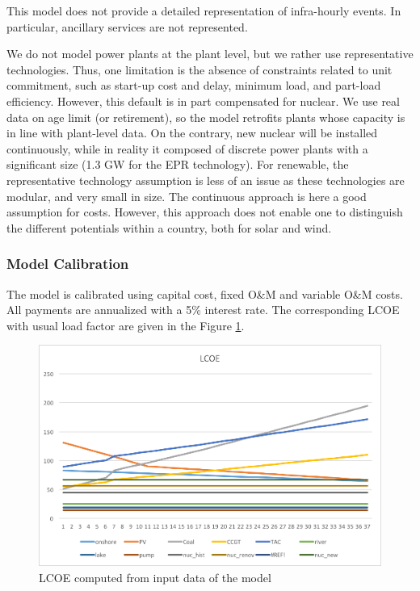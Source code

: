 This model does not provide a detailed representation of infra-hourly events. In particular, ancillary services are not represented. 

We do not model power plants at the plant level, but we rather use representative technologies. Thus, one limitation is the absence of constraints related to unit commitment, such as start-up cost and delay, minimum load, and part-load efficiency. 
However, this default is in part compensated for nuclear. We use real data on age limit (or retirement), so the model retrofits plants whose capacity is in line with plant-level data. On the contrary, new nuclear will be installed continuously, while in reality it composed of discrete power plants with a significant size (1.3 GW for the EPR technology).
For renewable, the representative technology assumption is less of an issue as these technologies are modular, and very small in size. The continuous approach is here a good assumption for costs. However, this approach does not enable one to distinguish the different potentials within a country, both for solar and wind. 


\clearpage

\subsubsection{Model Calibration}

\label{app:calibration}

The model is calibrated using capital cost, fixed O\&M and variable O\&M costs. All payments are annualized with a 5\% interest rate. The corresponding LCOE with usual load factor are given in the Figure \ref{fig:calibration_LCOE}.

\begin{figure}[!ht]
	\centering
	\includegraphics[width=12cm]{figures/calibration_LCOE.png}
	\caption{LCOE computed from input data of the model}
	\label{fig:calibration_LCOE}
\end{figure}

